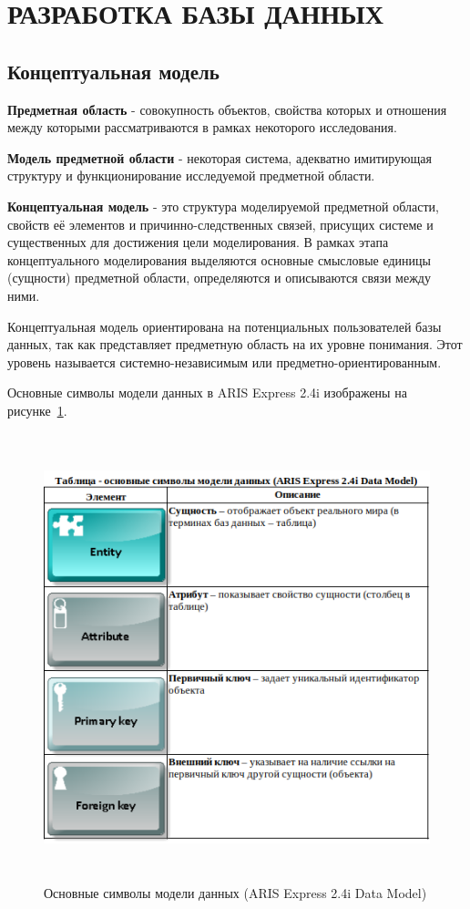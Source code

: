 \section{РАЗРАБОТКА БАЗЫ ДАННЫХ}
\subsection{Концептуальная модель}

\textbf{Предметная область} - совокупность объектов,
свойства которых и отношения между которыми рассматриваются в рамках некоторого исследования.

\textbf{Модель предметной области} - некоторая система, адекватно имитирующая
структуру и функционирование исследуемой предметной области.

\textbf{Концептуальная модель} - это структура моделируемой предметной области,
свойств её элементов и причинно-следственных связей, присущих системе и
существенных для достижения цели моделирования.
В рамках этапа концептуального моделирования выделяются основные смысловые единицы (сущности)
предметной области, определяются и описываются связи между ними.

Концептуальная модель ориентирована на потенциальных пользователей базы данных,
так как представляет предметную область на их уровне понимания.
Этот уровень называется системно-независимым или предметно-ориентированным.

Основные символы модели данных в ARIS Express 2.4i \cite{ArisExpress} 
изображены на рисунке~\ref{fig:ArisDataModel}.

\begin{figure}[!h]
    \centering

    \includegraphics[height=13cm]
    {assets/ARIS/DataModel/Elements/ArisDataModel.png}

    \caption{Основные символы модели данных (ARIS Express 2.4i Data Model)}

    \label{fig:ArisDataModel}
\end{figure}

